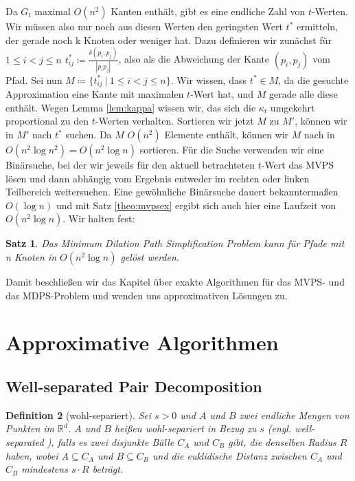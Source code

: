 \documentclass[11pt]{article}
\newcommand{\R}{\mathbb{R}}
\newtheorem{theorem}{Satz}[section]
\newtheorem{definition}[theorem]{Definition}
\begin{document}
	Da $G_t$ maximal $O(n^2)$ Kanten enthält, gibt es eine endliche Zahl von $t$-Werten. Wir müssen also nur noch aus diesen Werten den geringsten Wert $t^*$ ermitteln, der gerade noch k Knoten oder weniger hat. Dazu definieren wir zunächst für $1\leq i < j \leq n$ $t^*_{ij} \coloneqq\frac{\delta(p_i, p_j)}{|p_i p_j|}$, also als die Abweichung der Kante $(p_i, p_j)$ vom Pfad. Sei nun $M\coloneqq\{t^*_{ij}\ |\ 1\leq i < j \leq n\}$. Wir wissen, dass $t^* \in M$, da die gesuchte Approximation eine Kante mit maximalen $t$-Wert hat, und $M$ gerade alle diese enthält. Wegen Lemma \ref{lem:kappa} wissen wir, das sich die $\kappa_t$ umgekehrt proportional zu den $t$-Werten verhalten. Sortieren wir jetzt $M$ zu $M'$, können wir in $M'$ nach $t^*$ suchen. Da $M$ $O(n^2)$ Elemente enthält, können wir $M$ nach \cite{hagerup} in $O(n^2\log n^2)=O(n^2\log n)$ sortieren. Für die Suche verwenden wir eine Binärsuche, bei der wir jeweils für den aktuell betrachteten $t$-Wert das MVPS lösen und dann abhängig vom Ergebnis entweder im rechten oder linken Teilbereich weitersuchen. 
	Eine gewöhnliche Binärsuche dauert bekanntermaßen $O(\log n)$ und mit Satz \ref{theo:mvpsex} ergibt sich auch hier eine Laufzeit von $O(n^2\log n)$. Wir halten fest:
	\begin{theorem}
		Das Minimum Dilation Path Simplification Problem kann für Pfade mit n Knoten in $O(n^2 \log n)$ gelöst werden.
	\end{theorem}
	
	Damit beschließen wir das Kapitel über exakte Algorithmen für das MVPS- und das MDPS-Problem und wenden uns approximativen Lösungen zu.

    \section{Approximative Algorithmen}
    \label{sec:approximative}
    

    \subsection{Well-separated Pair Decomposition}
    \label{subsec:wspd}
    
    \begin{definition}[wohl-separiert]
    	\label{def:wellsep}
    	Sei $s > 0$ und $A$ und $B$ zwei endliche Mengen von Punkten im $\R^d$. $A$ und $B$ heißen wohl-separiert in Bezug zu $s$ (engl. well-separated ), falls es zwei disjunkte Bälle $C_A$ und $C_B$ gibt, die denselben Radius $R$ haben, wobei $A \subseteq C_A$ und $B \subseteq C_B$ und die euklidische Distanz zwischen $C_A$ und $C_B$ mindestens $s\cdot R$ beträgt.
    \end{definition}
    
\end{document}
